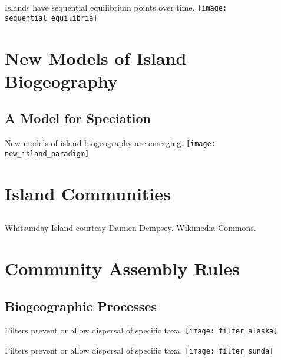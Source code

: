 \documentclass[xcolor=svgnames]{beamer}
\begin{document}
\begin{frame}{Islands have sequential equilibrium points over time.}
	\centering
		\texttt{[image: sequential\_equilibria]}
\end{frame}


\section{New Models of Island Biogeography}
\subsection{A Model for Speciation}

\begin{frame}{New models of island biogeography are emerging.}
	\centering
			\texttt{[image: new\_island\_paradigm]}
\end{frame}

\section{Island Communities}
\subsection{}

{
\begin{frame}[b,plain]
	\hfill\color{White!90!black}\tiny{Whitsunday Island courtesy Damien Dempsey. Wikimedia Commons.}
\end{frame}
}

\section{Community Assembly Rules}
\subsection{Biogeographic Processes}

\begin{frame}{Filters prevent or allow dispersal of specific taxa.}
	\centering
		\texttt{[image: filter\_alaska]}\\
\end{frame}

\begin{frame}{Filters prevent or allow dispersal of specific taxa.}
	\centering
		\texttt{[image: filter\_sunda]}\\
\end{frame}
\end{document}
